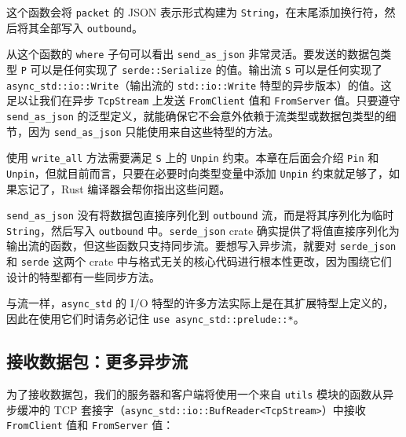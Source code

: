 这个函数会将 \texttt{packet} 的 JSON 表示形式构建为 \texttt{String}，在末尾添加换行符，然后将其全部写入 \texttt{outbound}。

从这个函数的 \texttt{where} 子句可以看出 \texttt{send\_as\_json} 非常灵活。要发送的数据包类型 \texttt{P} 可以是任何实现了 \texttt{serde::Serialize} 的值。输出流 \texttt{S} 可以是任何实现了 \texttt{async\_std::io::Write}（输出流的 \texttt{std::io::Write} 特型的异步版本）的值。这足以让我们在异步 \texttt{TcpStream} 上发送 \texttt{FromClient} 值和 \texttt{FromServer} 值。只要遵守 \texttt{send\_as\_json} 的泛型定义，就能确保它不会意外依赖于流类型或数据包类型的细节，因为 \texttt{send\_as\_json} 只能使用来自这些特型的方法。

使用 \texttt{write\_all} 方法需要满足 \texttt{S} 上的 \texttt{Unpin} 约束。本章在后面会介绍 \texttt{Pin} 和 \texttt{Unpin}，但就目前而言，只要在必要时向类型变量中添加 \texttt{Unpin} 约束就足够了，如果忘记了，Rust 编译器会帮你指出这些问题。

\texttt{send\_as\_json} 没有将数据包直接序列化到 \texttt{outbound} 流，而是将其序列化为临时 \texttt{String}，然后写入 \texttt{outbound} 中。\texttt{serde\_json} crate 确实提供了将值直接序列化为输出流的函数，但这些函数只支持同步流。要想写入异步流，就要对 \texttt{serde\_json} 和 \texttt{serde} 这两个 crate 中与格式无关的核心代码进行根本性更改，因为围绕它们设计的特型都有一些同步方法。

与流一样，\texttt{async\_std} 的 I/O 特型的许多方法实际上是在其扩展特型上定义的，因此在使用它们时请务必记住 \texttt{use async\_std::prelude::*}。

\subsection{接收数据包：更多异步流}

为了接收数据包，我们的服务器和客户端将使用一个来自 \texttt{utils} 模块的函数从异步缓冲的 TCP 套接字（\texttt{async\_std::io::BufReader<TcpStream>}）中接收 \texttt{FromClient} 值和 \texttt{FromServer} 值：


